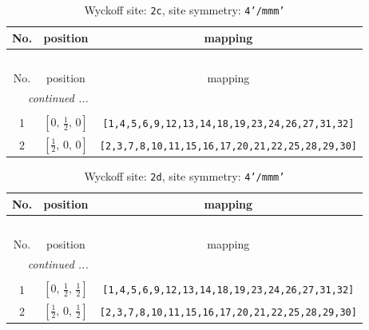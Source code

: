 \documentclass[fleqn,8pt]{jsarticle}
\begin{document}
\renewcommand{\arraystretch}{1.2}
\begin{longtable}{ccc}
\caption{Wyckoff site: {\tt 2c}, site symmetry: {\tt 4'/mmm'}}
 \\
 \hline \hline
No. & position & mapping \\ \hline \endfirsthead

\multicolumn{2}{l}{\tablename\ \thetable{}} \\
 \hline \hline
No. & position & mapping \\ \hline \endhead

 \hline \hline
\multicolumn{2}{r}{\footnotesize\it continued ...} \\ \endfoot

 \hline \hline
\multicolumn{2}{r}{} \\ \endlastfoot

1 & $\left[ 0,\, \frac{1}{2},\, 0 \right]$ & {\tt [1,4,5,6,9,12,13,14,18,19,23,24,26,27,31,32]} \\ \hline
2 & $\left[ \frac{1}{2},\, 0,\, 0 \right]$ & {\tt [2,3,7,8,10,11,15,16,17,20,21,22,25,28,29,30]} \\
\end{longtable}
\renewcommand{\arraystretch}{1.2}
\begin{longtable}{ccc}
\caption{Wyckoff site: {\tt 2d}, site symmetry: {\tt 4'/mmm'}}
 \\
 \hline \hline
No. & position & mapping \\ \hline \endfirsthead

\multicolumn{2}{l}{\tablename\ \thetable{}} \\
 \hline \hline
No. & position & mapping \\ \hline \endhead

 \hline \hline
\multicolumn{2}{r}{\footnotesize\it continued ...} \\ \endfoot

 \hline \hline
\multicolumn{2}{r}{} \\ \endlastfoot

1 & $\left[ 0,\, \frac{1}{2},\, \frac{1}{2} \right]$ & {\tt [1,4,5,6,9,12,13,14,18,19,23,24,26,27,31,32]} \\ \hline
2 & $\left[ \frac{1}{2},\, 0,\, \frac{1}{2} \right]$ & {\tt [2,3,7,8,10,11,15,16,17,20,21,22,25,28,29,30]} \\
\end{longtable}
\renewcommand{\arraystretch}{1.2}
\end{document}
